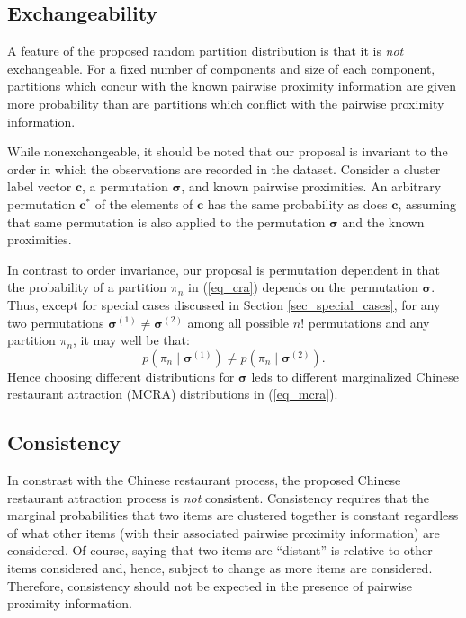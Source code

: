 \documentclass[lineno]{biometrika-dbd}
\newcommand{\partition}{\ensuremath{\pi}}
\newcommand{\given}{\mid}
\begin{document}
\subsection{Exchangeability}

A feature of the proposed random partition distribution is that it is
\emph{not} exchangeable.  For a fixed number of components and size of each
component, partitions which concur with the known pairwise proximity
information are given more probability than are partitions which conflict with
the pairwise proximity information.

While nonexchangeable, it should be noted that our proposal is invariant to the
order in which the observations are recorded in the dataset.  Consider a
cluster label vector $\bm{c}$, a permutation $\bm{\sigma}$, and known pairwise
proximities.  An arbitrary permutation $\bm{c}^\ast$ of the elements of
$\bm{c}$ has the same probability as does $\bm{c}$, assuming that same
permutation is also applied to the permutation $\bm{\sigma}$ and the known
proximities.

In contrast to order invariance, our proposal is permutation dependent in that
the probability of a partition $\partition_n$ in (\ref{eq_cra}) depends on the
permutation $\bm{\sigma}$.  Thus, except for special cases discussed in Section
\ref{sec_special_cases}, for any two permutations $\bm{\sigma}^{(1)} \not=
\bm{\sigma}^{(2)}$ among all possible $n!$ permutations and any partition
$\partition_n$, it may well be that:
\begin{equation}
\label{eq_permutation_invariance}
p(\partition_n \given \bm{\sigma}^{(1)}) \not= p(\partition_n \given \bm{\sigma}^{(2)}).
\end{equation}
Hence choosing different distributions for $\bm{\sigma}$ leds to different
marginalized Chinese restaurant attraction (MCRA) distributions in
(\ref{eq_mcra}).

\subsection{Consistency}

In constrast with the Chinese restaurant process, the proposed Chinese
restaurant attraction process is \emph{not} consistent.  Consistency requires
that the marginal probabilities that two items are clustered together is
constant regardless of what other items (with their associated pairwise
proximity information) are considered.  Of course, saying that two items are
``distant'' is relative to other items considered and, hence, subject to change
as more items are considered.  Therefore, consistency should not be expected in
the presence of pairwise proximity information.
\end{document}
